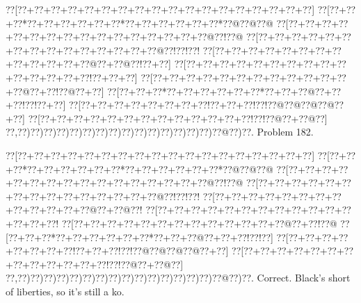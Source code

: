 \documentclass[a5paper]{article}
\begin{document}
\newpage
\begin{center}
{\goo
\0??[\0??+\0??+\0??+\0??+\0??+\0??+\0??+\0??+\0??+\0??+\0??+\0??+\0??+\0??+\0??+\0??+\0??+\0??]
\0??[\0??+\0??+\0??*\0??+\0??+\0??+\0??+\0??+\0??*\0??+\0??+\0??+\0??+\0??+\0??*\0??@\0??@\0??@
\0??[\0??+\0??+\0??+\0??+\0??+\0??+\0??+\0??+\0??+\0??+\0??+\0??+\0??+\0??+\0??+\0??@\0??!\0??@
\0??[\0??+\0??+\0??+\0??+\0??+\0??+\0??+\0??+\0??+\0??+\0??+\0??+\0??+\0??+\0??@\0??!\0??!\0??!
\0??[\0??+\0??+\0??+\0??+\0??+\0??+\0??+\0??+\0??+\0??+\0??+\0??+\0??@\0??+\0??@\0??!\0??+\0??]
\0??[\0??+\0??+\0??+\0??+\0??+\0??+\0??+\0??+\0??+\0??+\0??+\0??+\0??+\0??+\0??!\0??+\0??+\0??]
\0??[\0??+\0??+\0??+\0??+\0??+\0??+\0??+\0??+\0??+\0??+\0??+\0??+\0??@\0??+\0??!\0??@\0??+\0??]
\0??[\0??+\0??+\0??*\0??+\0??+\0??+\0??+\0??+\0??*\0??+\0??+\0??@\0??+\0??+\0??!\0??!\0??+\0??]
\0??[\0??+\0??+\0??+\0??+\0??+\0??+\0??+\0??!\0??+\0??+\0??!\0??!\0??@\0??@\0??@\0??@\0??+\0??]
\0??[\0??+\0??+\0??+\0??+\0??+\0??+\0??+\0??+\0??+\0??+\0??+\0??+\0??!\0??!\0??@\0??+\0??@\0??]
\0??,\0??)\0??)\0??)\0??)\0??)\0??)\0??)\0??)\0??)\0??)\0??)\0??)\0??)\0??)\0??)\0??@\0??)\0??.
}
Problem 182.

\end{center}
\begin{center}
{\goo
\0??[\0??+\0??+\0??+\0??+\0??+\0??+\0??+\0??+\0??+\0??+\0??+\0??+\0??+\0??+\0??+\0??+\0??+\0??]
\0??[\0??+\0??+\0??*\0??+\0??+\0??+\0??+\0??+\0??*\0??+\0??+\0??+\0??+\0??+\0??*\0??@\0??@\0??@
\0??[\0??+\0??+\0??+\0??+\0??+\0??+\0??+\0??+\0??+\0??+\0??+\0??+\0??+\0??+\0??+\0??@\0??!\0??@
\0??[\0??+\0??+\0??+\0??+\0??+\0??+\0??+\0??+\0??+\0??+\0??+\0??+\0??+\0??+\0??@\0??!\0??!\0??!
\0??[\0??+\0??+\0??+\0??+\0??+\0??+\0??+\0??+\0??+\0??+\0??+\0??+\0??@\0??+\0??@\0??!
\0??[\0??+\0??+\0??+\0??+\0??+\0??+\0??+\0??+\0??+\0??+\0??+\0??+\0??+\0??+\0??!
\0??[\0??+\0??+\0??+\0??+\0??+\0??+\0??+\0??+\0??+\0??+\0??+\0??+\0??@\0??+\0??!\0??@
\0??[\0??+\0??+\0??*\0??+\0??+\0??+\0??+\0??+\0??*\0??+\0??+\0??@\0??+\0??+\0??!\0??!\0??]
\0??[\0??+\0??+\0??+\0??+\0??+\0??+\0??+\0??!\0??+\0??+\0??!\0??!\0??@\0??@\0??@\0??@\0??+\0??]
\0??[\0??+\0??+\0??+\0??+\0??+\0??+\0??+\0??+\0??+\0??+\0??+\0??+\0??!\0??!\0??@\0??+\0??@\0??]
\0??,\0??)\0??)\0??)\0??)\0??)\0??)\0??)\0??)\0??)\0??)\0??)\0??)\0??)\0??)\0??)\0??@\0??)\0??.
}
Correct. Black's short of liberties, so it's still a ko.

\end{center}
\end{document}
